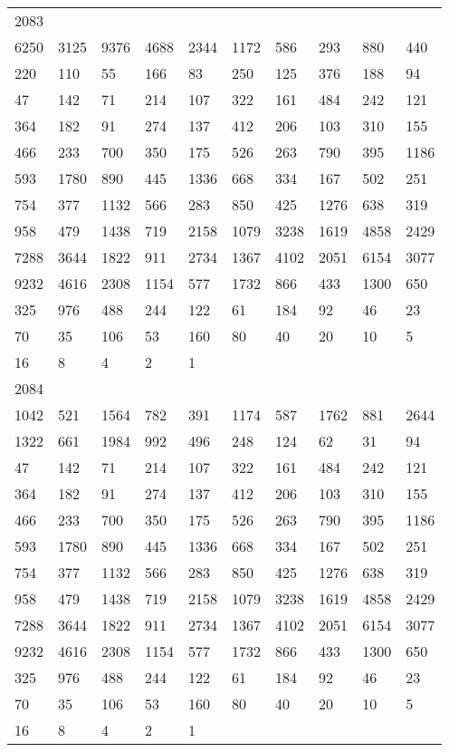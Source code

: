 \begin{longtable}{*{10}{l}}
2083&&&&&&&&&\\
6250& 3125& 9376& 4688& 2344& 1172& 586& 293& 880& 440\\
220& 110& 55& 166& 83& 250& 125& 376& 188& 94\\
47& 142& 71& 214& 107& 322& 161& 484& 242& 121\\
364& 182& 91& 274& 137& 412& 206& 103& 310& 155\\
466& 233& 700& 350& 175& 526& 263& 790& 395& 1186\\
593& 1780& 890& 445& 1336& 668& 334& 167& 502& 251\\
754& 377& 1132& 566& 283& 850& 425& 1276& 638& 319\\
958& 479& 1438& 719& 2158& 1079& 3238& 1619& 4858& 2429\\
7288& 3644& 1822& 911& 2734& 1367& 4102& 2051& 6154& 3077\\
9232& 4616& 2308& 1154& 577& 1732& 866& 433& 1300& 650\\
325& 976& 488& 244& 122& 61& 184& 92& 46& 23\\
70& 35& 106& 53& 160& 80& 40& 20& 10& 5\\
16& 8& 4& 2& 1& \\

2084&&&&&&&&&\\
1042& 521& 1564& 782& 391& 1174& 587& 1762& 881& 2644\\
1322& 661& 1984& 992& 496& 248& 124& 62& 31& 94\\
47& 142& 71& 214& 107& 322& 161& 484& 242& 121\\
364& 182& 91& 274& 137& 412& 206& 103& 310& 155\\
466& 233& 700& 350& 175& 526& 263& 790& 395& 1186\\
593& 1780& 890& 445& 1336& 668& 334& 167& 502& 251\\
754& 377& 1132& 566& 283& 850& 425& 1276& 638& 319\\
958& 479& 1438& 719& 2158& 1079& 3238& 1619& 4858& 2429\\
7288& 3644& 1822& 911& 2734& 1367& 4102& 2051& 6154& 3077\\
9232& 4616& 2308& 1154& 577& 1732& 866& 433& 1300& 650\\
325& 976& 488& 244& 122& 61& 184& 92& 46& 23\\
70& 35& 106& 53& 160& 80& 40& 20& 10& 5\\
16& 8& 4& 2& 1& \\


\end{longtable}
